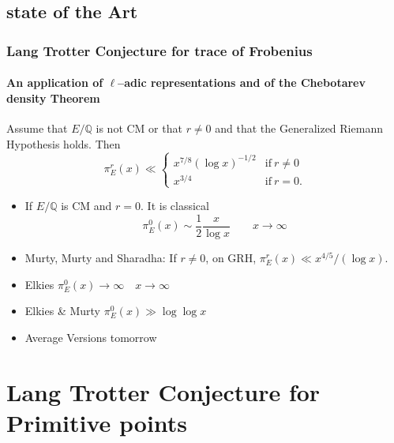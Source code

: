 \documentclass[10pt,final]{beamer} %
\newcommand{\Q}{\mathbb Q}
\theoremstyle{definition}
\begin{document}
\subsection{state of the Art}

\begin{frame}
\frametitle{Lang Trotter Conjecture for trace of Frobenius} 
\framesubtitle{An application of $\ell$--adic representations and of the Chebotarev density Theorem}\pause

\begin{theorem}[Serre]
Assume that $E/\Q$ is not CM or that $r\neq0$ and that the Generalized Riemann 
Hypothesis holds. Then
$$\pi_E^r(x)\ll\begin{cases} x^{7/8}(\log x)^{-1/2}&\text{if}\ r\ne0\\ x^{3/4}&\text{if}\ r=0.\end{cases}$$  
\end{theorem}\pause

\begin{itemize}[<+-| alert@+>]
 \item If $E/\Q$ is CM and $r=0$. It is classical
 $$\pi_E^0(x)\sim\frac12\frac{x}{\log x}\qquad x\rightarrow\infty$$
 \item Murty, Murty and Sharadha: If $r\ne0$, on GRH, $\pi_E^r(x)\ll x^{4/5}/(\log x).$
 \item Elkies $\pi_E^0(x)\rightarrow\infty\quad x\rightarrow\infty$
 \item Elkies \& Murty $\pi_E^0(x)\gg\log\log x$
 \item Average Versions tomorrow
 \end{itemize}

\end{frame}

\section{Lang Trotter Conjecture for Primitive points}
\end{document}
